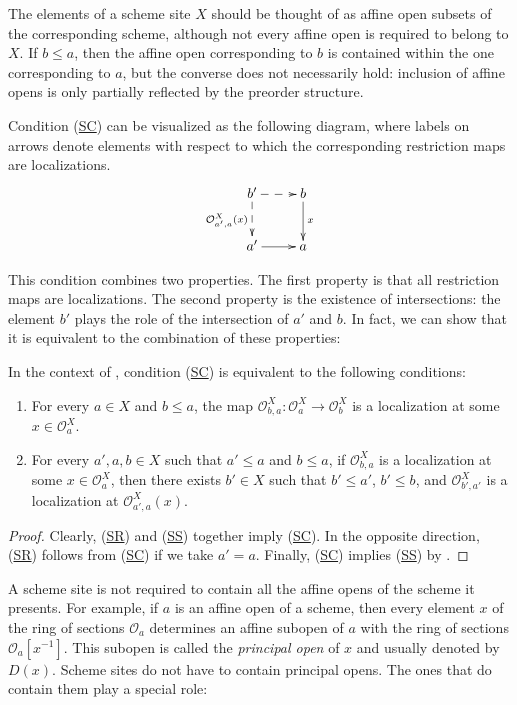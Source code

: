 \documentclass[reqno]{amsart}
\newcommand{\axitem}[1]{\phantomsection \label{ax:#1}}
\newcommand{\axref}[1]{(\hyperref[ax:#1]{#1})}
\theoremstyle{definition}
\theoremstyle{remark}
\numberwithin{figure}{section}
\begin{document}
The elements of a scheme site $X$ should be thought of as affine open subsets of the corresponding scheme, although not every affine open is required to belong to $X$.
If $b \leq a$, then the affine open corresponding to $b$ is contained within the one corresponding to $a$,
but the converse does not necessarily hold: inclusion of affine opens is only partially reflected by the preorder structure.

Condition \axref{SC} can be visualized as the following diagram, where labels on arrows denote elements with respect to which the corresponding restriction maps are localizations.
\[ \xymatrix{ b' \ar@{-->}[r] \ar@{-->}[d]_{\mathcal{O}^X_{a',a}(x)} & b \ar[d]^x \\
              a' \ar[r]                                              & a
	    } \]

This condition combines two properties.
The first property is that all restriction maps are localizations.
The second property is the existence of intersections: the element $b'$ plays the role of the intersection of $a'$ and $b$.
In fact, we can show that it is equivalent to the combination of these properties:

\begin{prop}
In the context of , condition \axref{SC} is equivalent to the following conditions:
\begin{enumerate}
\item[(SR)] \axitem{SR} For every $a \in X$ and $b \leq a$, the map $\mathcal{O}^X_{b,a} : \mathcal{O}^X_a \to \mathcal{O}^X_b$ is a localization at some $x \in \mathcal{O}^X_a$.
\item[(SS)] \axitem{SS} For every $a',a,b \in X$ such that $a' \leq a$ and $b \leq a$, if $\mathcal{O}^X_{b,a}$ is a localization at some $x \in \mathcal{O}^X_a$,
then there exists $b' \in X$ such that $b' \leq a'$, $b' \leq b$, and $\mathcal{O}^X_{b',a'}$ is a localization at $\mathcal{O}^X_{a',a}(x)$.
\end{enumerate}
\end{prop}
\begin{proof}
Clearly, \axref{SR} and \axref{SS} together imply \axref{SC}.
In the opposite direction, \axref{SR} follows from \axref{SC} if we take $a' = a$.
Finally, \axref{SC} implies \axref{SS} by .
\end{proof}

A scheme site is not required to contain all the affine opens of the scheme it presents.
For example, if $a$ is an affine open of a scheme, then every element $x$ of the ring of sections $\mathcal{O}_a$ determines an affine subopen of $a$ with the ring of sections $\mathcal{O}_a[x^{-1}]$.
This subopen is called the \emph{principal open} of $x$ and usually denoted by $D(x)$.
Scheme sites do not have to contain principal opens.
The ones that do contain them play a special role:
\end{document}
